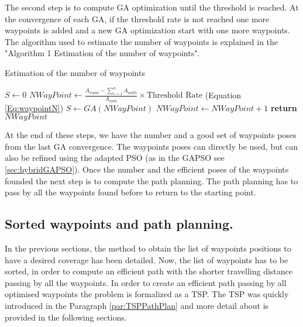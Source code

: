 The second step is to compute GA optimization until the threshold is reached. At the convergence of each GA, if the threshold rate is not reached one more waypoints is added and a new GA optimization start with one more waypoints. The algorithm used to estimate the number of waypoints is explained in the "Algorithm 1 Estimation of the number of waypoints".  \\
\begin{algorithm}{}
\caption{Estimation of the number of waypoints}\label{alg:euclid}
\begin{algorithmic}[6]
 \State $S\gets 0$
  \State $NWayPoint\gets \frac{ A_{room} - \sum_{i=1}^n A_{wall i} }{A_{cam}} \times \mbox{Threshold Rate} 
 $  (Equation \ref{Eq:waypointN})
	 \State $S \gets GA(NWayPoint)$
	  \State $NWayPoint\gets NWayPoint+1$
  \EndWhile\label{endwhile}
\State \textbf{return} $NWayPoint$
\EndProcedure
\end{algorithmic}
\end{algorithm}
At the end of these steps, we have the number and a good set of waypoints poses from the last GA convergence. The waypoints poses can directly be used, but can also be refined using the adapted PSO (as in the GAPSO see \ref{sec:hybridGAPSO}). Once the number and the efficient poses of the waypoints founded the next step is to compute the path planning. The path planning has to pass by all the waypoints found before to return to the starting point.  
	
 
  \subsection{Sorted waypoints and path planning.} \label{sec:sorted}
In the previous sections, the method to obtain the list of waypoints positions to have a desired coverage has been detailed. Now, the list of waypoints has to be sorted, in order to compute an efficient path with the shorter travelling distance passing by all the waypoints. In order to create an efficient path passing by all optimised waypoints the problem is formalized as a TSP. The TSP was quickly introduced in the Paragraph \ref{par:TSPPathPlan} and more detail about is provided in the following sections.

